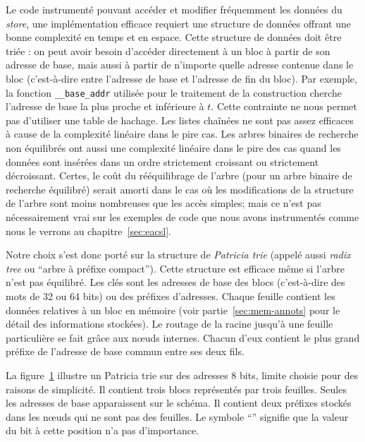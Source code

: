Le code instrumenté pouvant accéder et modifier fréquemment les données du
{\em store}, une implémentation efficace requiert une structure de données
offrant une bonne complexité en temps et en espace.
Cette structure de données doit être triée : on peut avoir besoin d'accéder
directement à un bloc à partir de son adresse de base, mais aussi à partir de
n'importe quelle adresse contenue dans le bloc (c'est-à-dire entre l'adresse de
base et l'adresse de fin du bloc).
Par exemple, la fonction \lstinline'__base_addr' utilisée pour le traitement
de la construction \baseaddrt cherche l'adresse de base la plus proche et
inférieure à $t$.
Cette contrainte ne nous permet pas d'utiliser une table de hachage.
Les listes chaînées ne sont pas assez efficaces à cause de la complexité
linéaire dans le pire cas.
Les arbres binaires de recherche non équilibrés ont aussi une complexité
linéaire dans le pire des cas quand les données sont insérées dans un ordre
strictement croissant ou strictement décroissant.
Certes, le coût du rééquilibrage de l'arbre (pour un arbre binaire de recherche
équilibré) serait amorti dans le cas où les modifications de la structure de
l'arbre sont moins nombreuses que les accès simples; mais ce n'est pas
nécessairement vrai sur les exemples de code que nous avons instrumentés comme
nous le verrons au chapitre~\ref{sec:eacsl}.

Notre choix s'est donc porté sur la structure de {\em Patricia trie}
\cite{Szpankowski/90} (appelé aussi {\em radix tree} ou ``arbre à préfixe
compact'').
Cette structure est efficace même si l'arbre n'est pas équilibré.
Les clés sont les adresses de base des blocs (c'est-à-dire des mots de 32 ou 64
bits) ou des préfixes d'adresses.
Chaque feuille contient les données relatives à un bloc en mémoire (voir
partie~\ref{sec:mem-annots} pour le détail des informations stockées).
Le routage de la racine jusqu'à une feuille particulière se fait grâce aux
n\oe{}uds internes.
Chacun d'eux contient le plus grand préfixe de l'adresse de base commun entre
ses deux fils.

La figure~\ref{fig:insertion-Patricia-trie-0} illustre un Patricia
trie sur des adresses 8 bits, limite choisie pour des raisons de simplicité.
Il contient trois blocs représentés par trois feuilles.
Seules les adresses de base apparaissent sur le schéma.
Il contient deux préfixes stockés dans les n\oe{}uds qui ne sont pas des
feuilles.
Le symbole ``{\tt *}'' signifie que la valeur du bit à cette position n'a pas
d'importance.

\begin{figure}[h]
  
  \label{fig:insertion-Patricia-trie-0}
\end{figure}

